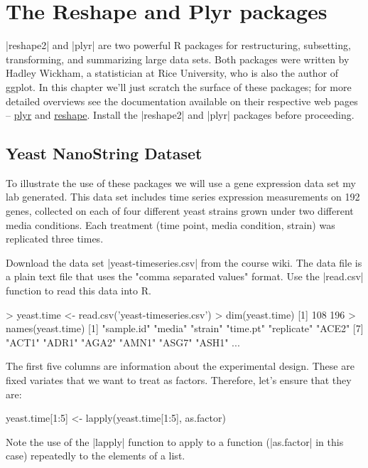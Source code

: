 

\section{The Reshape and Plyr packages}

|reshape2| and |plyr| are two powerful R packages for restructuring, subsetting, transforming, and summarizing large data sets. Both packages were written by Hadley Wickham, a statistician at Rice University, who is also the author of ggplot.  In this chapter we'll just scratch the surface of these packages; for more detailed overviews see the documentation available on their respective web pages -- \href{http://plyr.had.co.nz/}{plyr} and \href{http://had.co.nz/reshape/}{reshape}. Install the |reshape2| and |plyr| packages before proceeding.


\subsection{Yeast NanoString Dataset}

To illustrate the use of these packages we will use a gene expression data set my lab generated.  This data set includes time series expression measurements on 192 genes, collected on each of four different yeast strains grown under two different media conditions. Each treatment (time point, media condition, strain) was replicated three times.  

Download the data set |yeast-timeseries.csv| from the course wiki. The data file is a plain text file that uses the "comma separated values" format. Use the |read.csv| function to read this data into R.
%
\begin{R}
> yeast.time <- read.csv('yeast-timeseries.csv')
> dim(yeast.time)
[1] 108 196
> names(yeast.time)
  [1] "sample.id"  "media"      "strain"     "time.pt"    "replicate"  "ACE2"      
  [7] "ACT1"       "ADR1"       "AGA2"       "AMN1"       "ASG7"       "ASH1" 
...
\end{R}

The first five columns are information about the experimental design.  These are fixed variates that we want to treat as factors. Therefore, let's ensure that they are:
%
\begin{R}
yeast.time[1:5] <- lapply(yeast.time[1:5], as.factor)
\end{R}
%
Note the use of the |lapply| function to apply to a function (|as.factor| in this case) repeatedly to the elements of a list.

